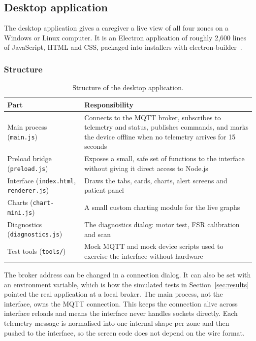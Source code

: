 \subsection{Desktop application}
The desktop application gives a caregiver a live view of all four zones on a Windows or Linux computer. It is an Electron application of roughly 2,600 lines of JavaScript, HTML and CSS, packaged into installers with electron-builder~\cite{electron}.

\subsubsection{Structure}
{\small{}
\begin{table}[H]
\centering
\begin{tabularx}{\textwidth}{@{}>{\raggedright\arraybackslash}p{5.0cm}X@{}}
\toprule
\textbf{Part} & \textbf{Responsibility}\\
\midrule
Main process (\texttt{main.js}) & Connects to the MQTT broker, subscribes to telemetry and status, publishes commands, and marks the device offline when no telemetry arrives for 15 seconds\\
Preload bridge (\texttt{preload.js}) & Exposes a small, safe set of functions to the interface without giving it direct access to Node.js\\
Interface (\texttt{index.html}, \texttt{renderer.js}) & Draws the tabs, cards, charts, alert screens and patient panel\\
Charts (\texttt{chart-mini.js}) & A small custom charting module for the live graphs\\
Diagnostics (\texttt{diagnostics.js}) & The diagnostics dialog: motor test, FSR calibration and \itwoc{} scan\\
Test tools (\texttt{tools/}) & Mock MQTT and mock device scripts used to exercise the interface without hardware\\
\bottomrule
\end{tabularx}
\caption{Structure of the desktop application.}
\end{table}}
The broker address can be changed in a connection dialog. It can also be set with an environment variable, which is how the simulated tests in Section~\ref{sec:results} pointed the real application at a local broker. The main process, not the interface, owns the MQTT connection. This keeps the connection alive across interface reloads and means the interface never handles sockets directly. Each telemetry message is normalised into one internal shape per zone and then pushed to the interface, so the screen code does not depend on the wire format.

